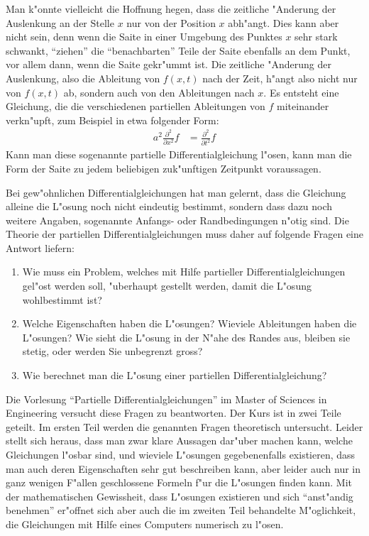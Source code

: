 Man k"onnte vielleicht die Hoffnung hegen, dass die zeitliche "Anderung
der Auslenkung an der Stelle $x$ nur von der Position $x$ abh"angt.
Dies kann aber nicht sein, denn wenn die Saite in einer Umgebung
des Punktes $x$ sehr stark schwankt, ``ziehen'' die ``benachbarten'' Teile
der Saite ebenfalls an dem Punkt, vor allem dann, wenn die Saite gekr"ummt
ist. Die zeitliche "Anderung der Auslenkung, also die Ableitung von $f(x,t)$
nach der Zeit, h"angt also nicht nur von $f(x,t)$ ab, sondern auch von
den Ableitungen nach $x$. Es entsteht eine Gleichung, die die verschiedenen
partiellen Ableitungen von $f$ miteinander verkn"upft, zum Beispiel in
etwa folgender Form:
\begin{align*}
a^2\frac{\partial^2}{\partial x^2}f&= \frac{\partial^2}{\partial t^2}f
\end{align*}
Kann man diese sogenannte partielle Differentialgleichung l"osen,
kann man die Form der Saite zu jedem
beliebigen zuk"unftigen Zeitpunkt voraussagen.

Bei gew"ohnlichen Differentialgleichungen hat man gelernt, dass die Gleichung
alleine die L"osung noch nicht eindeutig bestimmt, sondern dass dazu noch
weitere Angaben, sogenannte Anfangs- oder Randbedingungen n"otig sind.
Die Theorie der partiellen Differentialgleichungen muss daher auf folgende
Fragen eine Antwort liefern:
\begin{enumerate}
\item Wie muss ein Problem, welches mit Hilfe partieller Differentialgleichungen
gel"ost werden soll, "uberhaupt gestellt werden, damit die L"osung wohlbestimmt
ist?
\item Welche Eigenschaften haben die L"osungen? Wieviele Ableitungen haben
die L"osungen? Wie sieht die L"osung in der N"ahe des Randes aus, bleiben
sie stetig, oder werden Sie unbegrenzt gross?
\item Wie berechnet man die L"osung einer partiellen Differentialgleichung?
\end{enumerate}
Die Vorlesung ``Partielle Differentialgleichungen'' im Master of Sciences in
Engineering versucht diese Fragen zu beantworten. Der Kurs ist in zwei Teile
geteilt. Im ersten Teil werden die genannten Fragen theoretisch untersucht.
Leider stellt sich heraus, dass man zwar klare Aussagen dar"uber machen kann,
welche Gleichungen l"osbar sind, und wieviele L"osungen gegebenenfalls
existieren, dass man auch deren Eigenschaften sehr gut beschreiben kann,
aber leider auch nur in ganz wenigen F"allen geschlossene Formeln f"ur die
L"osungen finden kann. Mit der mathematischen Gewissheit, dass L"osungen
existieren und sich ``anst"andig benehmen'' er"offnet sich aber auch die
im zweiten Teil behandelte M"oglichkeit, die Gleichungen mit Hilfe eines
Computers numerisch zu l"osen.

